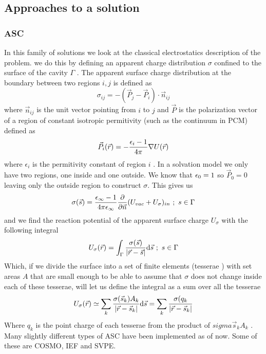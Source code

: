 \documentclass[../master_thesis.tex]{subfiles}
\begin{document}
\subsection{Approaches to a solution}
\subsubsection{ \ac{ASC}}
In this family of solutions we look at the classical electrostatics description
of the problem. we do this by defining an apparent charge distribution
$\sigma$ confined to the surface of the cavity $\Gamma$ \cite{Tomasi:1994wt, Tomasi:2005ipa}.
The apparent surface charge distribution at the boundary between two regions $i, j$
is defined as
\begin{equation}
  \sigma_{ij} = -(\vec{P}_j - \vec{P}_i)\cdot\vec{n}_{ij}
\end{equation}
where $\vec{n}_{ij}$ is the unit vector pointing from $i$ to $j$ and $\vec{P}$ is
the polarization vector of a region of constant isotropic permitivity (such as
the continuum in \ac{PCM}) defined as
\begin{equation}
  \vec{P}_i (\vec{r}) = - \frac{\epsilon_i - 1}{4\pi}\nabla U(\vec{r})
\end{equation}
where $\epsilon_i$ is the permitivity constant of region $i$ \cite{Tomasi:2005ipa}.
In a solvation model we only have two regions, one inside and one outside. We
know that $\epsilon_{0} = 1$ so $\vec{P}_0 = 0$ leaving only the outside region to
construct $\sigma$. This gives us \cite{Tomasi:2005ipa}
\begin{equation}
  \sigma(\vec{s}) =\frac{\epsilon_{\infty} - 1}{4\pi\epsilon_{\infty}} \frac{\partial}{\partial\vec{n}} (U_{vac} + U_{\sigma})_{in}\ ;\ s \in \Gamma
\end{equation}
and we find the reaction potential of the apparent surface charge $U_{\sigma}$
with the following integral
 \begin{equation}
   U_{\sigma}(\vec{r}) = \int_{\Gamma}\frac{\sigma(\vec{s})}{\abs{\vec{r} - \vec{s}}} \text{d}\vec{s}\ ;\ s \in \Gamma
 \end{equation}
Which, if we divide the surface into a set of finite elements (tesserae
\cite{Tomasi:2005ipa, Sorland}) with set areas $A$ that are small enough to be able
to assume that $\sigma$ does not change inside each of these tesserae, will let us define the integral
as a sum over all the tesserae
\begin{equation}
   U_{\sigma}(\vec{r}) \simeq \sum_k\frac{\sigma(\vec{s}_k) A_k}{\abs{\vec{r} - \vec{s}_k}} \text{d}\vec{s}
   = \sum_k\frac{\sigma(q_k}{\abs{\vec{r} - \vec{s}_k}}
\end{equation}
Where $q_k$ is the point charge of each tesserae from the product of $sigma{\vec{s}_k}A_k$
\cite{Tomasi:2005ipa}.
Many slightly different types of \ac{ASC} have been implemented as of now. Some of these
are \ac{COSMO}, \ac{IEF} and \ac{SVPE}.
\end{document}
